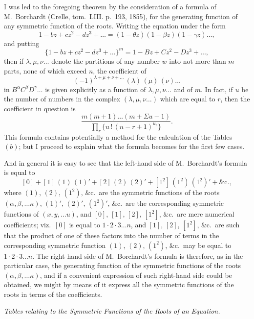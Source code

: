 \documentclass[11pt,a4paper]{article}
\begin{document}
I was led to the foregoing theorem by the consideration of a formula of
M.~Borchardt (Crelle, tom.~LIII. p.~193, 1855), for the generating function
of any symmetric function of the roots. Writing the equation under the form
\[
1 - bz + cz^2 - dz^3 + \ldots = (1 - \theta z)(1 - \beta z)(1 - \gamma z)\ldots,
\]
and putting
\[
\{1 - bz + cz^2 - dz^3 + \ldots\}^m = 1 - Bz + Cz^2 - Dz^3 + \ldots,
\]
then if $\lambda, \mu, \nu\ldots$ denote the partitions of any number $w$
into not more than $m$ parts, none of which exceed $n$, the coefficient of
\[
(-1)^{\lambda + \mu + \nu + \ldots}\, (\lambda)\, (\mu)\, (\nu) \ldots
\]
in $B^\alpha C^\beta D^\gamma \ldots$ is given explicitly as a function of
$\lambda, \mu, \nu\ldots$ and of $m$. In fact, if $u$ be the number of
numbers in the complex $(\lambda, \mu, \nu\ldots)$ which are equal to $r$,
then the coefficient in question is
\[
\frac{m(m+1)\ldots(m+\Sigma u - 1)}{\prod\limits_r \{u\, !\, (n-r+1)^{u_r}\}}.
\]
This formula contains potentially a method for the calculation of the
Tables~$(b)$; but I proceed to explain what the formula becomes for the first
few cases.

And in general it is easy to see that the left-hand side of M.~Borchardt's
formula is equal to
\[
[0] + [1]\,(1)\,(1)' + [2]\,(2)\,(2)' + [1^2]\,(1^2)\,(1^2)' + \&\text{c.},
\]
where $(1)$, $(2)$, $(1^2)$, \&c.\ are the symmetric functions of the roots
$(\alpha, \beta, \ldots \kappa)$, $(1)'$, $(2)'$, $(1^2)'$, \&c.\ are the
corresponding symmetric functions of $(x, y, \ldots u)$, and $[0]$, $[1]$,
$[2]$, $[1^2]$, \&c.\ are mere numerical coefficients; viz.\ $[0]$ is equal to
$1 \cdot 2 \cdot 3 \ldots n$, and $[1]$, $[2]$, $[1^2]$, \&c.\ are such that the
product of one of these factors into the number of terms in the corresponding
symmetric function $(1)$, $(2)$, $(1^2)$, \&c.\ may be equal to
$1 \cdot 2 \cdot 3 \ldots n$. The right-hand side of M.~Borchardt's formula is
therefore, as in the particular case, the generating function of the symmetric
functions of the roots $(\alpha, \beta, \ldots \kappa)$, and if a convenient
expression of such right-hand side could be obtained, we might by means of it
express all the symmetric functions of the roots in terms of the coefficients.

\begin{center}
\textit{Tables relating to the Symmetric Functions of the Roots of an Equation.}
\end{center}
\end{document}
